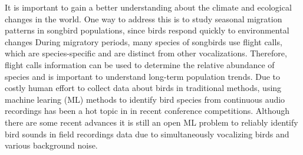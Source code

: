 It is important to gain a better understanding about the climate and ecological changes in the world. One way to address this is to study seasonal migration patterns in songbird populations, since birds respond quickly to environmental changes
During migratory periods, many species of songbirds use flight calls, which are species-specific and are distinct from other vocalizations. Therefore, flight calls information can be used to determine the relative abundance of species and is important to understand long-term population trends. Due to costly human effort to collect data about birds in traditional methods, using machine learing (ML) methods to identify bird species from continuous audio recordings has been a hot topic in in recent conference competitions. Although there are some recent advances  it is still an open ML problem to reliably identify bird sounds in field recordings data due to simultaneously vocalizing birds and various background noise.
